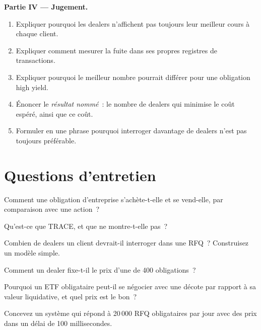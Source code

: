 \begin{problem}
\medskip\noindent\textbf{Partie IV --- Jugement.}
\begin{enumerate}[resume]
\item Expliquer pourquoi les dealers n'affichent pas toujours leur meilleur cours à chaque client.
\item Expliquer comment mesurer la fuite dans ses propres registres de transactions.
\item Expliquer pourquoi le meilleur nombre pourrait différer pour une obligation high yield.
\item Énoncer le \emph{résultat nommé}~: le nombre de dealers qui minimise le coût
espéré, ainsi que ce coût.
\item Formuler en une phrase pourquoi interroger davantage de dealers n'est pas toujours préférable.
\end{enumerate}
\end{problem}

\section{Questions d'entretien}

\begin{interviewq}\label{iq:m2:how-bonds-trade:1}
Comment une obligation d'entreprise s'achète-t-elle et se vend-elle, par comparaison avec une action~?
\end{interviewq}

\begin{interviewq}\label{iq:m2:how-bonds-trade:2}
Qu'est-ce que TRACE, et que ne montre-t-elle pas~?
\end{interviewq}

\begin{interviewq}\label{iq:m2:how-bonds-trade:3}
Combien de dealers un client devrait-il interroger dans une RFQ~? Construisez un modèle simple.
\end{interviewq}

\begin{interviewq}\label{iq:m2:how-bonds-trade:4}
Comment un dealer fixe-t-il le prix d'une  de 400 obligations~?
\end{interviewq}

\begin{interviewq}\label{iq:m2:how-bonds-trade:5}
Pourquoi un ETF obligataire peut-il se négocier avec une décote par rapport à sa valeur liquidative, et
quel prix est le bon~?
\end{interviewq}

\begin{interviewq}\label{iq:m2:how-bonds-trade:6}
Concevez un système qui répond à 20\,000 RFQ obligataires par jour avec des prix dans un délai de 100
millisecondes.
\end{interviewq}
